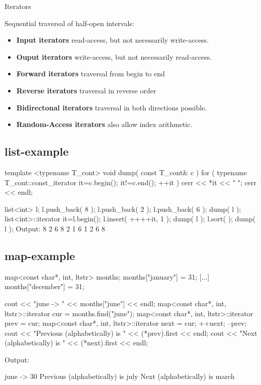 \centerline{\large Iterators}

Sequential traversal of half-open intervals: \id{[begin,.........,end)}
\begin{itemize}
\item \textbf{Input iterators} read-access, but not necessarily write-access.
\item \textbf{Ouput iterators} write-access, but not necessarily read-access.
\item \textbf{Forward iterators} traversal from begin to end
\item \textbf{Reverse iterators} traversal in reverse order
\item \textbf{Bidirectonal iterators} traversal in both directions possible.
\item \textbf{Random-Access iterators} also allow index arithmetic.

\end{itemize}


\subsection{list-example}

\begin{myverbatim}
template <typename T_cont>
void dump( const T_cont& c ) {
  for ( typename T_cont::const_iterator it=c.begin();
    it!=c.end(); ++it ) { cerr << *it << " "; }
  cerr << endl;
}

list<int> l;
l.push_back( 8 ); l.push_back( 2 ); l.push_back( 6 );
dump( l );
list<int>::iterator it=l.begin();
l.insert( ++++it, 1 ); dump( l );
l.sort( );             dump( l );
Output:
8 2 6
8 2 1 6
1 2 6 8
\end{myverbatim}

\subsection{map-example}
{\small
\begin{myverbatim}
map<const char*, int, ltstr> months;
months["january"] = 31;
[...]
months["december"] = 31;

cout << "june -> " << months["june"] << endl;
map<const char*, int, ltstr>::iterator cur  = months.find("june");
map<const char*, int, ltstr>::iterator prev = cur;
map<const char*, int, ltstr>::iterator next = cur;
++next;
--prev;
cout << "Previous (alphabetically) is " << (*prev).first << endl;
cout << "Next (alphabetically) is " << (*next).first << endl;
\end{myverbatim}
Output:
\begin{myverbatim}
june -> 30
Previous (alphabetically) is july
Next (alphabetically) is march
\end{myverbatim}
}


